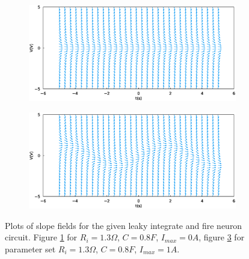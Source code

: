 \documentclass{scrartcl}			%
\begin{document}
\begin{figure}[H]	
	\centering
	\begin{subfigure}[b]{\textwidth}			%
		\includegraphics[width=1\linewidth]{imgs/slopes_circuitDGL_1.eps}
		\caption{}
		\label{fig:circ_dgl1} %
	\end{subfigure}

	\begin{subfigure}[b]{\textwidth}					%
		\includegraphics[width=1\linewidth]{imgs/slopes_circuitDGL_2.eps}
		\caption{}
		\label{fig:circ_dgl2} %
	\end{subfigure}
	\caption{Plots of slope fields for the given leaky integrate and fire neuron circuit. Figure \ref{fig:circ_dgl1} for $R_{i} = 1.3  \Omega$, $C = 0.8 F$, $I_{max} = 0 A$,  figure \ref{fig:circ_dgl2} for parameter set $R_{i} = 1.3  \Omega$, $C = 0.8 F$, $I_{max} = 1 A $.}
\end{figure}
\end{document}
